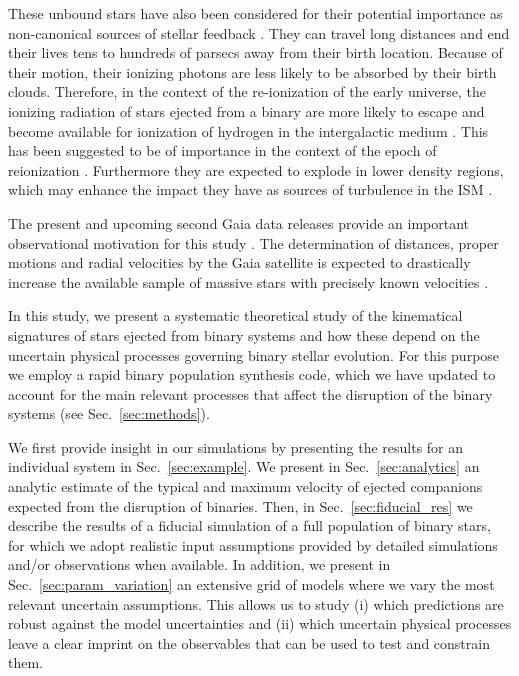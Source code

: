 \documentclass{aa}
\DeclareRobustCommand{\Secref}[1]{Sec.~\ref{#1}}
\begin{document}
These unbound stars have also been considered for their potential
importance as non-canonical sources of stellar feedback
\citep[e.g.,][]{larson:74, ceverino:09}. 
They can travel long distances and end their lives tens to hundreds of
parsecs away from their birth location. Because of their motion, their
ionizing photons are
less likely to be absorbed by their birth clouds. Therefore, in the context of the
re-ionization of the early universe, the ionizing radiation of stars
ejected from a binary are more likely to
escape and become available for ionization of hydrogen in the
intergalactic medium \citep[e.g.][]{conroy:12}. This has been
suggested to be of importance in the 
context of the epoch of reionization
\citep[e.g.,][]{conroy:12,kimm:14,Ma+2016}. Furthermore they are
expected to explode in lower density regions, which may enhance the
impact they have as sources of turbulence in the ISM \citep[e.g.][]{gatto:15}. 

The present and upcoming second Gaia data releases provide an important
observational motivation for this study \citep[e.g.,][]{perryman:01}. The determination of
distances, proper motions and radial velocities by the Gaia satellite
is expected to drastically increase the available sample of massive
stars with precisely known velocities
\citep{maoileidigh:05,  cacciari:09, Jeffries+2014,
  Gaia-Collaboration+2016, Gaia-Collaboration+2016a}.

In this study, we present a systematic theoretical study of the
kinematical signatures of stars ejected from binary systems and how
these depend on the uncertain physical processes governing binary
stellar evolution. For this purpose we employ a rapid binary
population synthesis code, which we have updated to account for the main relevant processes that affect the disruption of the binary systems (see \Secref{sec:methods}).  

We first provide insight in our simulations by presenting the results
for an individual system in \Secref{sec:example}.
We present in \Secref{sec:analytics} an analytic estimate of the
typical and maximum velocity of ejected companions expected from the
disruption of binaries. Then, in \Secref{sec:fiducial_res} we describe the results of a fiducial simulation of a
full population of binary stars, for which we adopt realistic
input assumptions provided by detailed simulations and/or observations
when available.  In addition, we present in
\Secref{sec:param_variation} an extensive grid of models where we vary the most relevant uncertain assumptions. This allows us to study (i) which predictions are robust against the model uncertainties and (ii) which uncertain physical processes leave a clear imprint on the observables that can be used to test and constrain them. 
\end{document}

